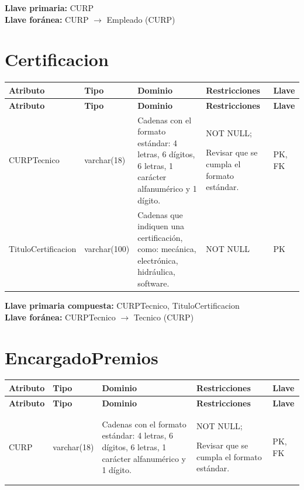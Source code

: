 \documentclass[12pt]{article}
\begin{document}
\vspace{2pt}
\textbf{Llave primaria:} CURP\\
\textbf{Llave foránea:} CURP $\rightarrow$ Empleado (CURP)\\

\section*{Certificacion}

\begin{longtable}{p{3.2cm} p{2.2cm} p{4.8cm} p{4.2cm} p{1.2cm}}
\label{tab:certificacion}\\
\toprule
\textbf{Atributo} & \textbf{Tipo} & \textbf{Dominio} & \textbf{Restricciones} & \textbf{Llave} \\
\midrule
\endfirsthead

\toprule
\textbf{Atributo} & \textbf{Tipo} & \textbf{Dominio} & \textbf{Restricciones} & \textbf{Llave} \\
\midrule
\endhead

\bottomrule
\endfoot

CURPTecnico 
& varchar(18) 
& Cadenas con el formato estándar: 4 letras, 6 dígitos, 6 letras, 1 carácter alfanumérico y 1 dígito.
& NOT NULL;

Revisar que se cumpla
el formato estándar.
& PK, FK \\

TituloCertificacion 
& varchar(100) 
& Cadenas que indiquen una certificación, como: mecánica, electrónica, hidráulica, software.
& NOT NULL 
& PK \\

\end{longtable}

\vspace{2pt}
\textbf{Llave primaria compuesta:} CURPTecnico, TituloCertificacion\\
\textbf{Llave foránea:} CURPTecnico $\rightarrow$ Tecnico (CURP)\\


\section*{EncargadoPremios}

\begin{longtable}{p{3.2cm} p{2.2cm} p{4.8cm} p{4.2cm} p{1.2cm}}
\label{tab:encargadopremios}\\
\toprule
\textbf{Atributo} & \textbf{Tipo} & \textbf{Dominio} & \textbf{Restricciones} & \textbf{Llave} \\
\midrule
\endfirsthead

\toprule
\textbf{Atributo} & \textbf{Tipo} & \textbf{Dominio} & \textbf{Restricciones} & \textbf{Llave} \\
\midrule
\endhead

\bottomrule
\endfoot

CURP 
& varchar(18) 
& Cadenas con el formato estándar: 4 letras, 6 dígitos, 6 letras, 1 carácter alfanumérico y 1 dígito.
& NOT NULL;

Revisar que se cumpla
el formato estándar.
& PK, FK \\

\end{longtable}
\end{document}
